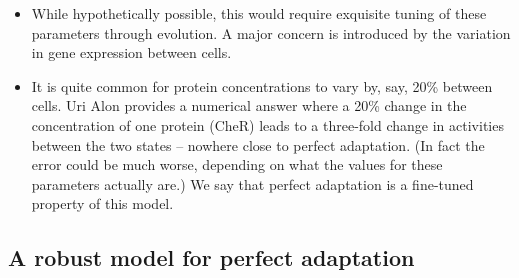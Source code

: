 \documentclass{article}
\begin{document}
\begin{itemize}
\item While hypothetically possible, this would require exquisite tuning of these parameters through evolution. A major concern is introduced by the variation in gene expression between cells.

\item It is quite common for protein concentrations to vary by, say, 20\% between cells. Uri Alon provides a numerical answer where a 20\% change in the concentration of one protein (CheR) leads to a three-fold change in activities between the two states -- nowhere close to perfect adaptation. (In fact the error could be much worse, depending on what the values for these parameters actually are.) We say that perfect adaptation is a fine-tuned property of this model.
\end{itemize}

\subsection*{A robust model for perfect adaptation} 
 
\end{document}
